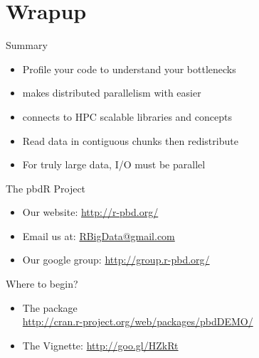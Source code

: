 \section{Wrapup}
\makesubcontentsslides
\hidenum

\begin{frame}
  \begin{block}{Summary}
    \begin{itemize}
    \item Profile your code to understand your bottlenecks
    \item \pbdR makes distributed parallelism with \R easier
    \item \pbdR connects \R to HPC scalable libraries and concepts
    \item Read data in contiguous chunks then redistribute
    \item For truly large data, I/O must be parallel
    \end{itemize}
  \end{block}
\end{frame}


\begin{frame}[noframenumbering]
  \begin{block}{The pbdR Project}
    \begin{itemize}
    \item Our website: \url{http://r-pbd.org/}
    \item Email us at: \url{RBigData@gmail.com}
    \item Our google group: \url{http://group.r-pbd.org/}
    \end{itemize}
  \end{block}
  \begin{block}{Where to begin?}
    \begin{itemize}
    \item The  package\\
      \url{http://cran.r-project.org/web/packages/pbdDEMO/}\\
    \item The  Vignette: \url{http://goo.gl/HZkRt}
    \end{itemize}
  \end{block}
\end{frame}


\section*{} %


